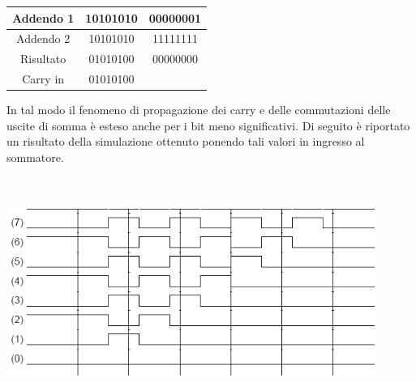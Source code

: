 \documentclass[11pt,  english, makeidx, a4paper, titlepage, oneside]{book}
\begin{document}
{\begin{center}
\begin{tabular}{|c|c|c|}
\hline
Addendo 1 & 10101010 & 00000001\\
\hline
Addendo 2 & 10101010 & 11111111\\
\hline
Risultato & 01010100 & 00000000\\
\hline
Carry in & 01010100 & \\
\hline
\end{tabular}
\end{center}
\vspace{0.3cm}
In tal modo il fenomeno di propagazione dei carry e delle commutazioni delle uscite di somma è esteso anche per i bit meno significativi. Di seguito è riportato un risultato della simulazione ottenuto ponendo tali valori in ingresso al sommatore.
\\\\\\
\centerline{\includegraphics[width=12cm]{./img/Lab_1/Es_2/Worst_case_nostro.png}}
}
\newpage
\end{document}
